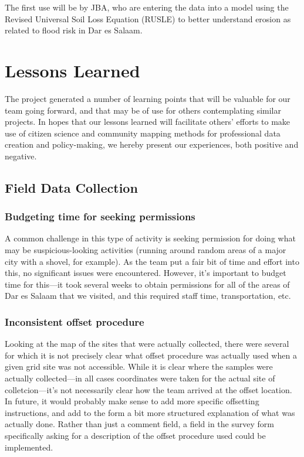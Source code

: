 \documentclass[a4paper,12pt]{article}
\begin{document}
The first use will be by JBA, who are entering the data into a model using the Revised Universal Soil Loss Equation (RUSLE) to better understand erosion as related to flood risk in Dar es Salaam.

\hypertarget{lessonslearned}{}
\section{Lessons Learned}
\label{lessonslearned}
The project generated a number of learning points that will be valuable for our team going forward, and that may be of use for others contemplating similar projects. In hopes that our lessons learned will facilitate others' efforts to make use of citizen science and community mapping methods for professional data creation and policy-making, we hereby present our experiences, both positive and negative.

\subsection{Field Data Collection}
\label{fielddatacollection}

\subsubsection{Budgeting time for seeking permissions}
A common challenge in this type of activity is seeking permission for doing what may be suspicious-looking activities (running around random areas of a major city with a shovel, for example). As the team put a fair bit of time and effort into this, no significant issues were encountered. However, it's important to budget time for this---it took several weeks to obtain permissions for all of the areas of Dar es Salaam that we visited, and this required staff time, transportation, etc.

\subsubsection{Inconsistent offset procedure}
Looking at the map of the sites that were actually collected, there were several for which it is not precisely clear what offset procedure was actually used when a given grid site was not accessible. While it is clear where the samples were actually collected---in all cases coordinates were taken for the actual site of colletcion---it's not necessarily clear how the team arrived at the offset location. In future, it would probably make sense to add more specific offsetting instructions, and add to the form a bit more structured explanation of what was actually done. Rather than just a comment field, a field in the survey form specifically asking for a description of the offset procedure used could be implemented.
\end{document}

